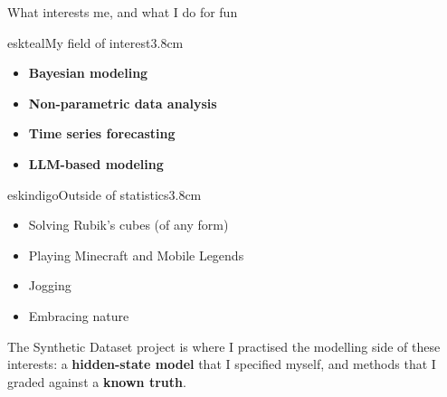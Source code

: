 \documentclass[aspectratio=169,11pt,t]{beamer}
\newcommand{\key}[1]{\textcolor{keyresult}{\textbf{#1}}}
\begin{document}
\begin{frame}{What interests me, and what I do for fun}
  \begin{minipage}[t]{0.485\textwidth}
  \begin{qbox}{eskteal}{My field of interest}{3.8cm}
    \small
    \begin{itemize}\setlength\itemsep{4pt}
      \item \textbf{Bayesian modeling}
      \item \textbf{Non-parametric data analysis}
      \item \textbf{Time series forecasting}
      \item \textbf{LLM-based modeling}
    \end{itemize}
  \end{qbox}
  \end{minipage}\hfill
  \begin{minipage}[t]{0.485\textwidth}
  \begin{qbox}{eskindigo}{Outside of statistics}{3.8cm}
    \small
    \begin{itemize}\setlength\itemsep{4pt}
      \item Solving Rubik's cubes (of any form)
      \item Playing Minecraft and Mobile Legends
      \item Jogging
      \item Embracing nature
    \end{itemize}
  \end{qbox}
  \end{minipage}
  \medskip

  \begin{keybox}\centering\small
    The Synthetic Dataset project is where I practised the modelling side of these
    interests: a \key{hidden-state model} that I specified myself, and methods that I
    graded against a \key{known truth}.
  \end{keybox}
\end{frame}
\end{document}
